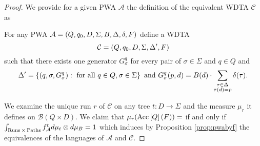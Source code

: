 \begin{proof}
  We provide for a given \ac{PWA} 
  $\mathcal{A}$
  the definition of the equivalent \ac{WDTA} $\mathcal{C}$ as
  \begin{definition}
    For any \ac{PWA} 
    $\mathcal{A} = \left(Q, q_{0}, D, \Sigma, B, \Delta, \delta, F\right)$ define a
    \ac{WDTA}
    \begin{equation*}
      \mathcal{C} = \left(Q, q_{0}, D, \Sigma, \Delta', F\right)
    \end{equation*} 
    such that there exists one generator $G_{\sigma}^{q}$ for every pair of 
    $\sigma\in\Sigma$ and $q\in Q$ and
    \begin{equation*}
      \Delta' = \left\{
        \left(q,\sigma,G_{\sigma}^{q}\right):
          \text{ for all }q\in Q,\sigma\in\Sigma
      \right\}
      \text{ and }
      G_{\sigma}^{q}(p, d) = B(d)\cdot\sum\limits_{
        \substack{\tau\in\Delta\\\tau(d) = p}}\delta(\tau).
    \end{equation*} 
  \end{definition}
  We examine the unique run $r$ of $\mathcal{C}$ on any tree 
  $t:D\rightarrow\Sigma$ and the measure $\mu_{r}$ it defines on 
  $\mathcal{B}(Q\times D)$. We claim that 
  $\mu_{r}(\operatorname{Acc}\left[Q\right](F)) =  $ if and only if 
  $\int_{\operatorname{Runs}\times\operatorname{Paths}}f_{\mathcal{A}}^{t}d\mu_{t}\otimes d\mu_{B} = 1$ 
  which induces by Proposition \ref{prop:pwabyf} the equivalences of the 
  languages of $\mathcal{A}$ and $\mathcal{C}$.


\end{proof}
